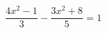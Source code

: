 \begin{ex}
	\begin{condition}
		\( \dfrac{4x^2-1}{3}-\dfrac{3x^2+8}{5}=1 \)
	\end{condition}
\end{ex}